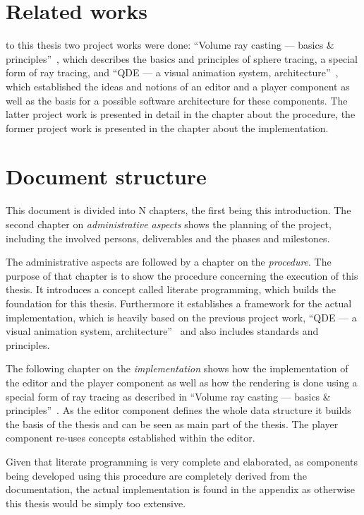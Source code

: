 \documentclass[%
    a4paper,
    nobib,   %
    openany  %
]{tufte-book}
\begin{document}
\section{Related works}
\label{sec:related-works}

 to this thesis two project works were done:
\enquote{Volume ray casting --- basics \&
principles}~\cite{osterwalder_volume_2016}, which describes the basics and
principles of sphere tracing, a special form of ray tracing, and \enquote{QDE
--- a visual animation system, architecture}~\cite{osterwalder_qde_2016}, which
established the ideas and notions of an editor and a player component as well as
the basis for a possible software architecture for these components. The latter
project work is presented in detail in the chapter about the procedure, the
former project work is presented in the chapter about the implementation.

\section{Document structure}
\label{sec:document-structure}

This document is divided into N chapters, the first being this introduction. The
second chapter on \textit{administrative aspects} shows the planning of the
project, including the involved persons, deliverables and the phases and
milestones.

The administrative aspects are followed by a chapter on the \textit{procedure}.
The purpose of that chapter is to show the procedure concerning the execution of
this thesis. It introduces a concept called literate programming, which builds
the foundation for this thesis. Furthermore it establishes a framework for the
actual implementation, which is heavily based on the previous project work,
``QDE --- a visual animation system, architecture''~\cite{osterwalder_qde_2016}
and also includes standards and principles.

The following chapter on the \textit{implementation} shows how the
implementation of the editor and the player component as well as how the
rendering is done using a special form of ray tracing as described in ``Volume
ray casting --- basics \& principles''~\cite{osterwalder_volume_2016}. As the
editor component defines the whole data structure it builds the basis of the
thesis and can be seen as main part of the thesis. The player component re-uses
concepts established within the editor.

Given that literate programming is very complete and elaborated, as components
being developed using this procedure are completely derived from the
documentation, the actual implementation is found in the appendix as otherwise
this thesis would be simply too extensive.
\end{document}
